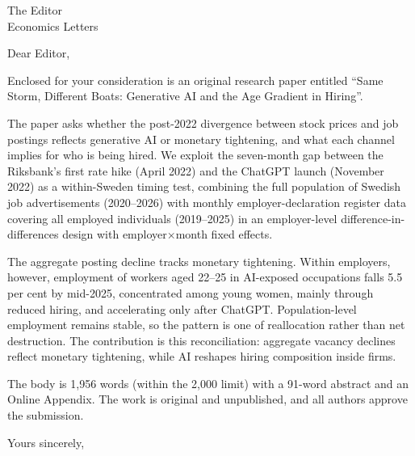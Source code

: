 \documentclass[11pt]{letter}
\begin{document}
\begin{letter}{The Editor\\Economics Letters}

\opening{Dear Editor,}

Enclosed for your consideration is an original research paper entitled ``Same Storm, Different Boats: Generative AI and the Age Gradient in Hiring''.

The paper asks whether the post-2022 divergence between stock prices and job postings reflects generative AI or monetary tightening, and what each channel implies for who is being hired. We exploit the seven-month gap between the Riksbank's first rate hike (April 2022) and the ChatGPT launch (November 2022) as a within-Sweden timing test, combining the full population of Swedish job advertisements (2020--2026) with monthly employer-declaration register data covering all employed individuals (2019--2025) in an employer-level difference-in-differences design with employer$\times$month fixed effects.

The aggregate posting decline tracks monetary tightening. Within employers, however, employment of workers aged 22--25 in AI-exposed occupations falls 5.5 per cent by mid-2025, concentrated among young women, mainly through reduced hiring, and accelerating only after ChatGPT. Population-level employment remains stable, so the pattern is one of reallocation rather than net destruction. The contribution is this reconciliation: aggregate vacancy declines reflect monetary tightening, while AI reshapes hiring composition inside firms.

The body is 1{,}956 words (within the 2{,}000 limit) with a 91-word abstract and an Online Appendix. The work is original and unpublished, and all authors approve the submission.

\closing{Yours sincerely,}

\end{letter}
\end{document}
